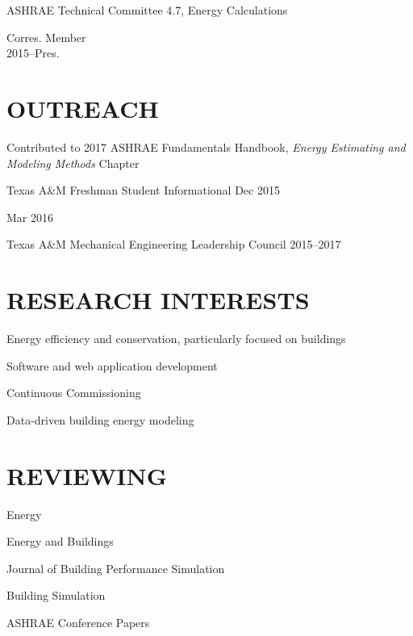 \documentclass[margin]{res} %
\begin{document}
\begin{resume}
\parbox[t]{9cm}{ASHRAE Technical Committee 4.7, Energy Calculations }\hfill \parbox[t]{3cm}{\raggedleft Corres. Member \\ 2015--Pres.}

\section{OUTREACH}
\parbox[t]{10cm}{Contributed to 2017 ASHRAE Fundamentals Handbook, \textit{Energy Estimating and Modeling Methods} Chapter}

Texas A\&M Freshman Student Informational \hfill Dec 2015\\
\strut \hfill Mar 2016

Texas A\&M Mechanical Engineering Leadership Council \hfill 2015--2017

\section{RESEARCH INTERESTS}

Energy efficiency and conservation, particularly focused on buildings

Software and web application development

Continuous Commissioning\textsuperscript{\textregistered{}}

Data-driven building energy modeling

\section{REVIEWING}

Energy

Energy and Buildings


Journal of Building Performance Simulation

Building Simulation

ASHRAE Conference Papers

\end{resume}

\end{document}
